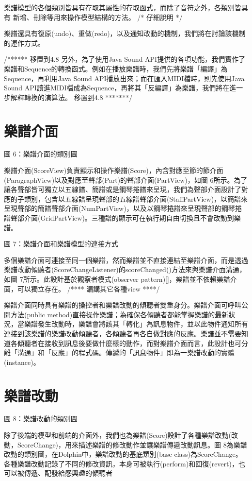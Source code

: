 \documentclass[12pt,a4paper,oneside]{report}
\begin{document}
樂譜模型的各個類別皆具有存取其屬性的存取函式，而除了音符之外，各類別皆具有
新增、刪除等用來操作模型結構的方法。 /*  
仔細說明  
*/

樂譜還具有復原(undo)、重做(redo)，以及通知改動的機制，我們將在討論該機制的運作方式。

/******  移置到4.8  
另外，為了使用Java Sound API提供的各項功能，我們實作了樂譜和Sequence的轉換函式。例如在播放樂譜時，我們先將樂譜「編譯」為Sequence，再利用Java Sound API播放出來；而在匯入MIDI檔時，則先使用Java Sound API讀進MIDI檔成為Sequence，再將其「反編譯」為樂譜，我們將在進一步解釋轉換的演算法。
移置到4.8  *******/

\section{樂譜介面}


圖 6：樂譜介面的類別圖

樂譜介面(ScoreView)負責顯示和操作樂譜(Score)，內含對應至節的節介面(ParagraphView)以及對應至聲部(Part)的聲部介面(PartView)，如圖 6所示。為了讓各聲部皆可獨立以五線譜、簡譜或是鋼琴捲譜來呈現，我們為聲部介面設計了對應的子類別，包含以五線譜呈現聲部的五線譜聲部介面(StaffPartView)，以簡譜來呈現聲部的簡譜聲部介面(NumPartView)，以及以鋼琴捲譜來呈現聲部的鋼琴捲譜聲部介面(GridPartView)。三種譜的顯示可在執行期自由切換且不會改動到樂譜。


圖 7：樂譜介面和樂譜模型的連接方式

多個樂譜介面可連接至同一個樂譜，然而樂譜並不直接連結至樂譜介面，而是透過樂譜改動傾聽者(ScoreChangeListener)的scoreChanged()方法來與樂譜介面溝通，如圖 7所示。此設計基於觀察者模式(observer pattern)[]，樂譜並不依賴樂譜介面，可以獨立存在。
/****
漏講其它各種view
****/

樂譜介面同時具有樂譜的操控者和樂譜改動的傾聽者雙重身分。樂譜介面可呼叫公開方法(public method)直接操作樂譜；為確保各傾聽者都能掌握樂譜的最新狀況，當樂譜發生改動時，樂譜會將該其「轉化」為訊息物件，並以此物件通知所有連接到該樂譜的樂譜改動傾聽者，各傾聽者再各自做對應的反應。樂譜並不需要知道各傾聽者在接收到訊息後要做什麼樣的動作，而對樂譜介面而言，此設計也可分離「溝通」和「反應」的程式碼。傳遞的「訊息物件」即為一樂譜改動的實體(instance)。

\section{樂譜改動}


圖 8：樂譜改動的類別圖

除了後端的模型和前端的介面外，我們也為樂譜(Score)設計了各種樂譜改動(改動，ScoreChange)，用來描述樂譜的修改動作並讓樂譜傳遞改動訊息。圖 8為樂譜改動的類別圖，在Dolphin中，樂譜改動的基底類別(base class)為ScoreChange。各種樂譜改動記錄了不同的修改資訊，本身可被執行(perform)和回復(revert)，也可以被傳遞、配發給感興趣的傾聽者
\end{document}

